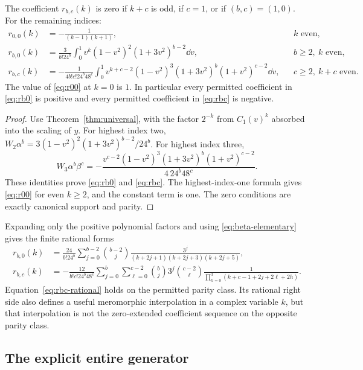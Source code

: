 \begin{theorem}\label{thm:mixed}
The coefficient $r_{b,c}(k)$ is zero if $k+c$ is odd, if $c=1$, or if $(b,c)=(1,0)$. For the remaining indices:
\begin{align}
 r_{0,0}(k)&=-\frac1{(k-1)(k+1)}, &&k\text{ even},\label{eq:r00}\\
 r_{b,0}(k)&=\frac3{b!24^b}\int_0^1
      v^k(1-v^2)^2(1+3v^2)^{b-2}\dd v,
      &&b\ge2,\ k\text{ even},\label{eq:rb0}\\
 r_{b,c}(k)&=-\frac1{4b!c!24^b48^c}\int_0^1
      v^{k+c-2}(1-v^2)^3(1+3v^2)^b(1+v^2)^{c-2}\dd v,
      &&c\ge2,\ k+c\text{ even}.\label{eq:rbc}
\end{align}
The value of \eqref{eq:r00} at $k=0$ is $1$. In particular every permitted coefficient in \eqref{eq:rb0} is positive and every permitted coefficient in \eqref{eq:rbc} is negative.
\end{theorem}
\begin{proof}
Use Theorem~\ref{thm:universal}, with the factor $2^{-k}$ from $C_1(v)^k$ absorbed into the scaling of $y$. For highest index two, $W_2\alpha^b=3(1-v^2)^2(1+3v^2)^{b-2}/24^b$. For highest index three,
\[
 W_3\alpha^b\beta^c
 =-\frac{v^{c-2}(1-v^2)^3(1+3v^2)^b(1+v^2)^{c-2}}
          {4\,24^b48^c}.
\]
These identities prove \eqref{eq:rb0} and \eqref{eq:rbc}. The highest-index-one formula gives \eqref{eq:r00} for even $k\ge2$, and the constant term is one. The zero conditions are exactly canonical support and parity.
\end{proof}

Expanding only the positive polynomial factors and using \eqref{eq:beta-elementary} gives the finite rational forms
\begin{align}
 r_{b,0}(k)&=\frac{24}{b!24^b}
 \sum_{j=0}^{b-2}\binom{b-2}{j}
 \frac{3^j}{(k+2j+1)(k+2j+3)(k+2j+5)},\label{eq:rb-rational}\\
 r_{b,c}(k)&=-\frac{12}{b!c!24^b48^c}
 \sum_{j=0}^{b}\sum_{\ell=0}^{c-2}
 \binom bj3^j\binom{c-2}{\ell}
 \frac1{\prod_{h=0}^3(k+c-1+2j+2\ell+2h)}.\label{eq:rbc-rational}
\end{align}
Equation~\eqref{eq:rbc-rational} holds on the permitted parity class. Its rational right side also defines a useful meromorphic interpolation in a complex variable $k$, but that interpolation is not the zero-extended coefficient sequence on the opposite parity class.

\subsection{The explicit entire generator}

